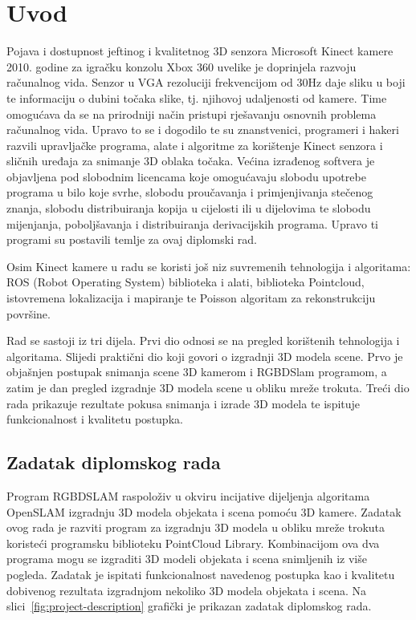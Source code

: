 \newpage

\setcounter{page}{1}
\setcounter{figure}{0}
\section{Uvod}%
\label{sec:Uvod}

Pojava i dostupnost jeftinog i kvalitetnog 3D senzora Microsoft Kinect
kamere 2010. godine za igračku konzolu Xbox 360 uvelike je doprinjela
razvoju računalnog vida. Senzor u VGA rezoluciji frekvencijom od 30Hz
daje sliku u boji te informaciju o dubini točaka slike, tj. njihovoj
udaljenosti od kamere. Time omogućava da se na prirodniji način pristupi
rješavanju osnovnih problema računalnog vida.  Upravo to se i dogodilo
te su znanstvenici, programeri i hakeri razvili upravljačke programa,
alate i algoritme za korištenje Kinect senzora i sličnih uređaja za
snimanje 3D oblaka točaka. Većina izrađenog softvera je objavljena pod
slobodnim licencama koje omogućavaju slobodu upotrebe programa u bilo
koje svrhe, slobodu proučavanja i primjenjivanja stečenog znanja,
slobodu distribuiranja kopija u cijelosti ili u dijelovima te slobodu
mijenjanja, poboljšavanja i distribuiranja derivacijskih programa.
Upravo ti programi su postavili temlje za ovaj diplomski rad.

Osim Kinect kamere u radu se koristi još niz suvremenih tehnologija i
algoritama: ROS (Robot Operating System) biblioteka i alati, biblioteka
Pointcloud, istovremena lokalizacija i mapiranje te Poisson algoritam za
rekonstrukciju površine.

Rad se sastoji iz tri dijela. Prvi dio odnosi se na pregled korištenih
tehnologija i algoritama. Slijedi praktični dio koji govori o
izgradnji 3D modela scene. Prvo je objašnjen postupak snimanja scene 3D
kamerom i RGBDSlam programom, a zatim je dan pregled izgradnje 3D modela
scene u obliku mreže trokuta. Treći dio rada prikazuje rezultate pokusa
snimanja i izrade 3D modela te ispituje funkcionalnost i kvalitetu
postupka.

\newpage
\subsection{Zadatak diplomskog rada} %
\label{sub:Zadatak diplomskog rada}

Program RGBDSLAM raspoloživ u okviru incijative dijeljenja algoritama
OpenSLAM  izgradnju 3D modela objekata i scena
pomoću 3D kamere. Zadatak ovog rada je razviti program za izgradnju 3D
modela u obliku mreže trokuta koristeći programsku biblioteku PointCloud
Library.  Kombinacijom ova dva programa mogu se izgraditi 3D modeli
objekata i scena snimljenih iz više pogleda. Zadatak je ispitati
funkcionalnost navedenog postupka kao i kvalitetu dobivenog rezultata
izgradnjom nekoliko 3D modela objekata i scena. Na
slici~\ref{fig:project-description} grafički je prikazan zadatak
diplomskog rada.

